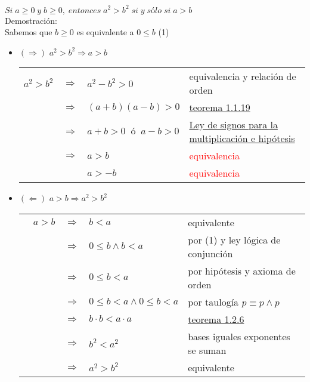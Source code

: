 \begin{teo}
$Si \; a\geq 0 \; y \; b\geq 0, \; entonces \; a^2 > b^2 \; si \; y \; sólo \; si \;  a>b $ \\ \label{teo 1.2.10}
Demostración:\\
Sabemos que $b\geq 0 $ es equivalente a $0\leq b$ (1)
\begin{itemize}
\item $(\Rightarrow)$
$a^2>b^2 \Rightarrow a>b$
\begin{center}
\begin{tabular}{r c l l}
$a^2>b^2$&$\Rightarrow$&$a^2-b^2>0$& equivalencia y relación de orden\\
&$\Rightarrow$&$(a+b)(a-b)>0$&\hyperref[teo 1.1.19]{teorema 1.1.19}\\
&$\Rightarrow$&$a+b>0 \; \; ó \; \; a-b>0$&\hyperref[teo 1.2.7]{Ley de signos para la multiplicación e hipótesis}\\
&$\Rightarrow$&$a>b$&\textcolor{red}{equivalencia}\\
&&$a>-b$&\textcolor{red}{equivalencia}\\
\end{tabular}
\end{center}
\item $(\Leftarrow)$
$a>b \Rightarrow a^2>b^2$
\begin{center}
\begin{tabular}{c r c l l}
&$a>b$&$\Rightarrow$&$b<a$&equivalente\\
&&$\Rightarrow$&$0\leq b \land b<a$&por (1) y ley lógica de conjunción\\
&&$\Rightarrow$&$0\leq b < a$&por hipótesis y  axioma de orden\\
&&$\Rightarrow$&$0\leq b < a \land 0\leq b < a $&por taulogía $p \equiv p \land p $\\
&&$\Rightarrow$&$b\cdot b < a \cdot a$&\hyperref[teo 1.2.6]{teorema 1.2.6}\\
&&$\Rightarrow$&$b^2<a^2$&bases iguales exponentes se suman\\
&&$\Rightarrow$&$a^2>b^2$&equivalente\\
\end{tabular}
\end{center}
\end{itemize}
\end{teo}